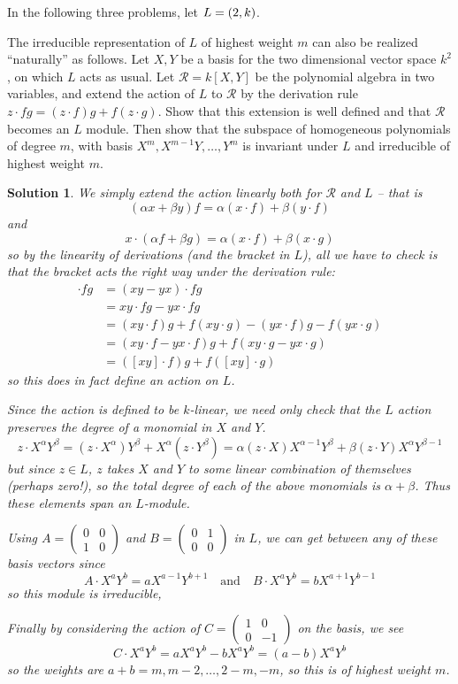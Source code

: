 \documentclass[12pt]{article}
\newenvironment{hwprob}[1]
{\renewcommand{\theprob}{#1}%
 \addtocounter{thm}{-1}%
 \begin{prob}}
{\end{prob}}
\theoremstyle{nonumberbreak}
\newtheorem{sol}{Solution}
\theoremstyle{changebreak}
\theoremstyle{nonumberbreak}
\theoremstyle{change}
\let\sl\relax
\DeclareMathOperator{\sl}{\mathfrak{sl}}
\begin{document}
\newpage
In the following three problems, let $L=\sl(2,k)$.
\begin{hwprob}{7.4}
	The irreducible representation of $L$ of highest weight $m$ can also be realized ``naturally''
	as follows. Let $X,Y$ be a basis for the two dimensional vector space $k^2$, on which $L$ acts as usual. Let $\mathscr{R}=k[X,Y]$
	be the polynomial algebra in two variables, and extend the action of $L$ to $\mathscr{R}$ by the derivation rule
	$z\cdot fg=(z\cdot f)g+f(z\cdot g)$. Show that this extension is well defined and that $\mathscr{R}$ becomes an $L$ module. Then show that
	the subspace of homogeneous polynomials of degree $m$, with basis $X^m,X^{m-1}Y,\dots,Y^m$ is invariant under $L$ and irreducible of highest weight $m$.
\end{hwprob}
\begin{sol}
	We simply extend the action linearly both for $\mathscr{R}$ and $L$ -- that is
	\[(\alpha x+\beta y) f=\alpha(x\cdot f)+\beta(y\cdot f)\]
	and
	\[x\cdot (\alpha f+ \beta g)=\alpha(x\cdot f)+\beta(x\cdot g)\]
	so by the linearity of derivations (and the bracket in $L$), all we have to check is that the bracket acts the right way under the derivation rule:
	\begin{align*}
		[xy]\cdot fg &= (xy-yx)\cdot fg\\
		&= xy \cdot fg - yx\cdot fg\\
		&= (xy\cdot f)g+f(xy\cdot g)-(yx\cdot f)g-f(yx\cdot g)\\
		&= (xy\cdot f - yx\cdot f)g + f(xy\cdot g - yx\cdot g)\\
		&= ([xy]\cdot f)g +f([xy]\cdot g)
	\end{align*}
	so this does in fact define an action on $L$. 

	Since the action is defined to be $k$-linear, we need only check that the $L$ action preserves the degree of a monomial in $X$ and $Y$.
	\[z\cdot X^\alpha Y^\beta = (z\cdot X^\alpha)Y^\beta+ X^\alpha(z\cdot Y^\beta)=\alpha(z\cdot X)X^{\alpha-1}Y^\beta+\beta(z\cdot Y)X^\alpha Y^{\beta-1}\]
	but since $z\in L$, $z$ takes $X$ and $Y$ to some linear combination of themselves (perhaps zero!), so the total degree of each of the
	above monomials is $\alpha+\beta$. Thus these elements span an $L$-module.

	Using $A=(\begin{smallmatrix}0&0\\1 & 0\end{smallmatrix})$ and $B=(\begin{smallmatrix}0&1\\0 & 0\end{smallmatrix})$ in $L$,
	we can get between any of these basis vectors since 
	\[A\cdot X^aY^b=aX^{a-1}Y^{b+1}\quad\text{and}\quad B\cdot X^aY^b=bX^{a+1}Y^{b-1}\]
	so this module is irreducible,

	Finally by considering the action of $C=(\begin{smallmatrix}1&0\\0 & -1\end{smallmatrix})$ on the basis, we see 
	\[C\cdot X^aY^b=aX^aY^b-bX^aY^b=(a-b)X^aY^b\]
	so the weights are $a+b=m,m-2, \dots, 2-m, -m$, so this is of highest weight $m$.
\end{sol}
\end{document}
